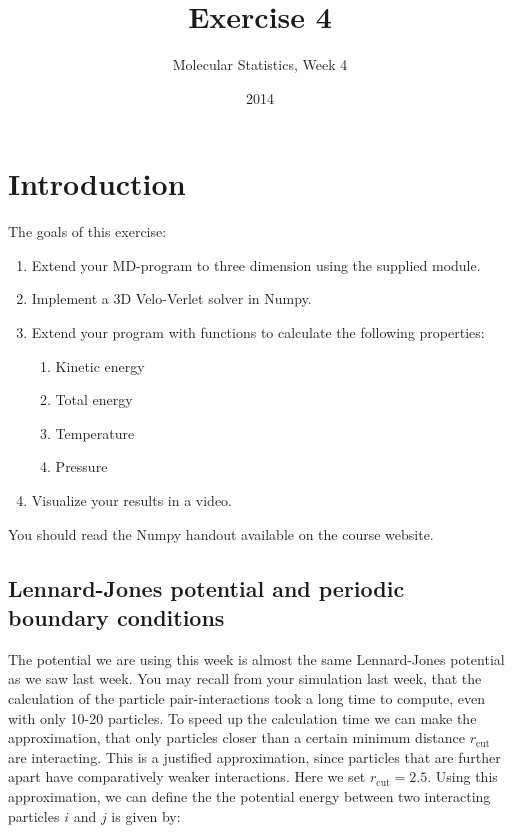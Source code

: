 \documentclass{article}
\title{Exercise 4}
\author{Molecular Statistics, Week 4}
\date{2014}
\begin{document}

\maketitle

\section{Introduction}

The goals of this exercise:
\begin{enumerate}
    \item Extend your MD-program to three dimension using the supplied module.

    \item Implement a 3D Velo-Verlet solver in Numpy.

    \item Extend your program with functions to calculate the following properties:
    \begin{enumerate}
        \item Kinetic energy
        \item Total energy
        \item Temperature
        \item Pressure
    \end{enumerate}

    \item Visualize your results in a video.

\end{enumerate}

You should read the Numpy handout available on the course website.


\subsection{Lennard-Jones potential and periodic boundary conditions}

The potential we are using this week is almost the same Lennard-Jones potential
as we saw last week.  You may recall from your simulation last week, that the
calculation of the particle pair-interactions took a long time to compute, even
with only 10-20 particles.
To speed up the calculation time we can make the approximation, that only
particles closer than a certain minimum distance $r_{\mathrm{cut}}$ are
interacting.
This is a justified approximation, since particles that are
further apart have comparatively weaker interactions.
Here we set $r_{\mathrm{cut}} = 2.5$.
Using this approximation, we can define the the potential energy between two
interacting particles $i$ and $j$ is given by:
\end{document}
